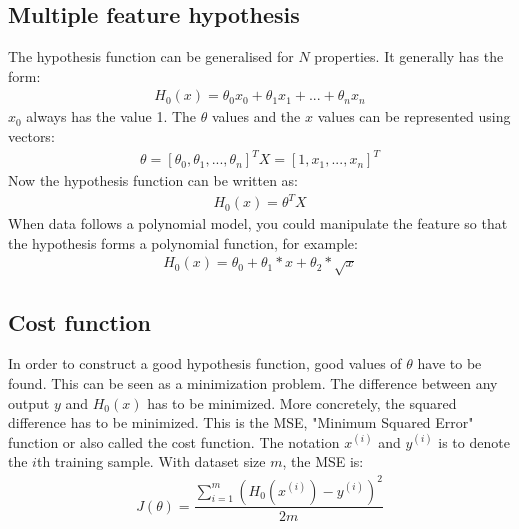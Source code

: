 \subsection{Multiple feature hypothesis}
\noindent The hypothesis function can be generalised for $N$ properties. It generally has the form:
\begin{align}
H_0(x) = \theta_0x_0 + \theta_1x_1 + ... + \theta_nx_n
\end{align}
$x_0$ always has the value 1. The $\theta$ values and the $x$ values can be represented using vectors:
\begin{align}
\theta = [\theta_0, \theta_1, ..., \theta_n]^T
X = [1, x_1, ... ,x_n]^T
\end{align}
Now the hypothesis function can be written as:
\begin{align}
H_0(x) = \theta^TX
\end{align}
When data follows a polynomial model, you could manipulate the feature so that the hypothesis forms a polynomial function, for example:
\begin{align}
H_0(x) = \theta_0 + \theta_1 * x + \theta_2 * \sqrt{x}
\end{align}
\subsection{Cost function}
In order to construct a good hypothesis function, good values of $\theta$ have to be found. This can be seen as a minimization problem. The difference between any output $y$ and $H_0(x)$ has to be minimized. More concretely, the squared difference has to be minimized. This is the MSE, "Minimum Squared Error" function or also called the cost function. The notation $x^{(i)}$ and $y^{(i)}$ is to denote the $i$th training sample. With dataset size $m$, the MSE is:
\begin{align}
J(\theta) = \dfrac{\sum\limits_{i=1}^m(H_0(x^{(i)}) - y^{(i)})^2}{2m}
\end{align}

